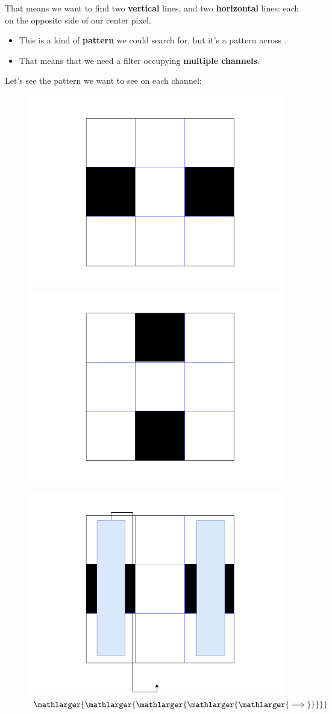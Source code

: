        That means we want to find two \textbf{vertical} lines, and two \textbf{horizontal} lines: each on the opposite side of our center pixel.

        \begin{itemize}
            \item This is a kind of \textbf{pattern} we could search for, but it's a pattern across .
            \item That means that we need a filter occupying \textbf{multiple channels}. 
        \end{itemize}

        Let's see the pattern we want to see on each channel:

        \begin{figure}[ht]
            \begin{minipage}{.35\textwidth}
              \centering
              \includegraphics[width=.45\linewidth]{images/convolutional_neural_networks_images/filterbank_1.png}
              \includegraphics[width=.45\linewidth]{images/convolutional_neural_networks_images/filterbank_2.png}
            \end{minipage}
            \begin{minipage}{.25\textwidth}
                \centering
                \caption*{$\mathlarger{\mathlarger{\mathlarger{\mathlarger{\mathlarger{\implies}}}}}$}
            \end{minipage}
            \begin{minipage}{.45\textwidth}
                \centering
                \includegraphics[width=.45\linewidth]{images/convolutional_neural_networks_images/filterbank_vertical.png}

\end{minipage}
\end{figure}
